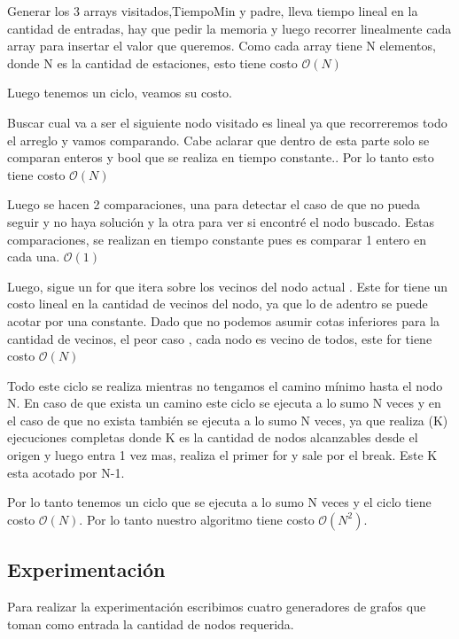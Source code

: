 Generar los 3 arrays visitados,TiempoMin y padre, lleva tiempo lineal en la cantidad de entradas, hay que pedir la memoria y luego recorrer linealmente cada array para insertar el valor que queremos. Como cada array tiene N elementos, donde N es la cantidad de estaciones,  esto tiene costo $\mathcal{O}(N)$

Luego tenemos un ciclo,  veamos su costo.

Buscar cual va a ser el siguiente nodo visitado es lineal ya que  recorreremos  todo el arreglo y vamos  comparando. Cabe aclarar que dentro de esta parte solo se comparan enteros y bool que se realiza en tiempo constante.. Por lo tanto esto tiene costo $\mathcal{O}(N)$

Luego se hacen 2 comparaciones, una para detectar el caso de que no pueda seguir y no haya solución y la otra para ver si encontré el nodo buscado. Estas comparaciones, se realizan en tiempo constante pues es comparar 1 entero en cada una. $\mathcal{O}(1)$

Luego,  sigue un for que itera sobre los vecinos del nodo actual . Este for tiene un costo lineal en la cantidad de vecinos del nodo, ya que lo de adentro se puede acotar por una constante.  Dado que no podemos asumir cotas inferiores para la cantidad de vecinos, el peor caso , cada nodo es vecino de todos, este for tiene costo  $\mathcal{O}(N)$

Todo este ciclo se realiza mientras no tengamos el camino mínimo  hasta el nodo N.  En caso de que exista un camino este ciclo se ejecuta a lo sumo N veces y en el caso de que no exista también se ejecuta a lo sumo N veces, ya que realiza (K) ejecuciones completas donde K es la cantidad de nodos alcanzables desde el origen y luego entra 1 vez mas, realiza el primer for y sale por el break. Este K esta acotado por N-1.

Por lo tanto tenemos un ciclo que se ejecuta a lo sumo N veces y el ciclo tiene costo $\mathcal{O}(N)$. Por lo tanto nuestro algoritmo tiene costo $\mathcal{O}(N^{2})$.


\subsection{Experimentación}

Para realizar la experimentación escribimos cuatro generadores de grafos que toman como entrada la cantidad de nodos requerida.


